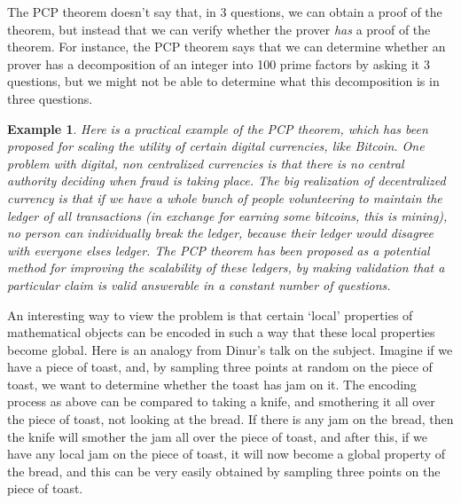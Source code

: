 \documentclass{article}
\theoremstyle{plain}
\newtheorem*{example}{Example}
\theoremstyle{definition}
\begin{document}
The PCP theorem doesn't say that, in 3 questions, we can obtain a proof of the theorem, but instead that we can verify whether the prover {\it has} a proof of the theorem. For instance, the PCP theorem says that we can determine whether an prover has a decomposition of an integer into 100 prime factors by asking it 3 questions, but we might not be able to determine what this decomposition is in three questions.%

\begin{example}
    Here is a practical example of the PCP theorem, which has been proposed for scaling the utility of certain digital currencies, like Bitcoin. One problem with digital, non centralized currencies is that there is no central authority deciding when fraud is taking place. The big realization of decentralized currency is that if we have a whole bunch of people volunteering to maintain the ledger of all transactions (in exchange for earning some bitcoins, this is mining), no person can individually break the ledger, because their ledger would disagree with everyone elses ledger. The PCP theorem has been proposed as a potential method for improving the scalability of these ledgers, by making validation that a particular claim is valid answerable in a constant number of questions.
\end{example}

An interesting way to view the problem is that certain `local' properties of mathematical objects can be encoded in such a way that these local properties become global. Here is an analogy from Dinur's talk on the subject. Imagine if we have a piece of toast, and, by sampling three points at random on the piece of toast, we want to determine whether the toast has jam on it. The encoding process as above can be compared to taking a knife, and smothering it all over the piece of toast, not looking at the bread. If there is any jam on the bread, then the knife will smother the jam all over the piece of toast, and after this, if we have any local jam on the piece of toast, it will now become a global property of the bread, and this can be very easily obtained by sampling three points on the piece of toast.
\end{document}
